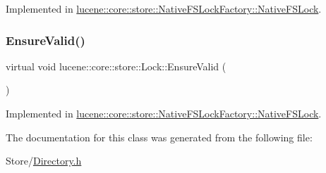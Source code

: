 Implemented in \mbox{\hyperlink{classlucene_1_1core_1_1store_1_1NativeFSLockFactory_1_1NativeFSLock_abf6743e414d802ed2f715a5c7884c0a9}{lucene\+::core\+::store\+::\+Native\+F\+S\+Lock\+Factory\+::\+Native\+F\+S\+Lock}}.

\mbox{\label{classlucene_1_1core_1_1store_1_1Lock_ac0bc9440594100dad788e2b8f7e38cfc}} 
\subsubsection{\texorpdfstring{Ensure\+Valid()}{EnsureValid()}}
{\footnotesize\ttfamily virtual void lucene\+::core\+::store\+::\+Lock\+::\+Ensure\+Valid (\begin{DoxyParamCaption}{ }\end{DoxyParamCaption})\hspace{0.3cm}{\ttfamily [pure virtual]}}



Implemented in \mbox{\hyperlink{classlucene_1_1core_1_1store_1_1NativeFSLockFactory_1_1NativeFSLock_ac07d2b080272048dd7edb5ed0eca0396}{lucene\+::core\+::store\+::\+Native\+F\+S\+Lock\+Factory\+::\+Native\+F\+S\+Lock}}.



The documentation for this class was generated from the following file\+:\begin{DoxyCompactItemize}
\item 
Store/\mbox{\hyperlink{Directory_8h}{Directory.\+h}}\end{DoxyCompactItemize}
